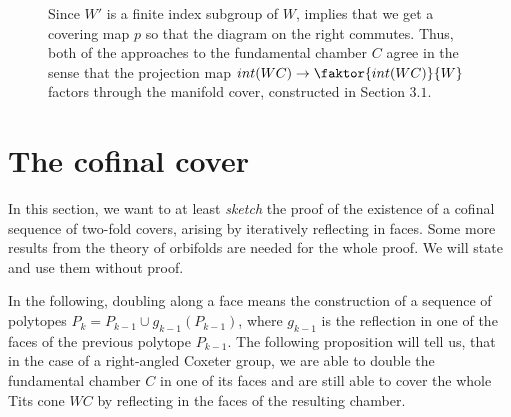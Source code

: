 \begin{figure}[h!]
    \begin{minipage}[c]{.6\textwidth}
        Since \(W'\) is a finite index subgroup of \(W\),  implies that we get a covering map \(p\) so that the diagram on the right commutes.
        Thus, both of the approaches to the fundamental chamber \(C\) agree in the sense that the projection map \(int(WC) \to \faktor{int(WC)}{W}\) factors through the manifold cover, constructed in Section \(3.1\).
    \end{minipage}\quad
    \begin{minipage}{.35\textwidth}\vspace*{-1em}
    \end{minipage}
\end{figure}


\section{The cofinal cover}

In this section, we want to at least \emph{sketch} the proof of the existence of a cofinal sequence of two-fold covers, arising by iteratively reflecting in faces.
Some more results from the theory of orbifolds are needed for the whole proof.
We will state and use them without proof.

In the following, doubling along a face means the construction of a sequence of polytopes \(P_k = P_{k-1} \cup g_{k-1}(P_{k-1})\), where \(g_{k-1}\) is the reflection in one of the faces of the previous polytope \(P_{k-1}\).
The following proposition will tell us, that in the case of a right-angled Coxeter group, we are able to double the fundamental chamber \(C\) in one of its faces and are still able to cover the whole Tits cone \(WC\) by reflecting in the faces of the resulting chamber.


